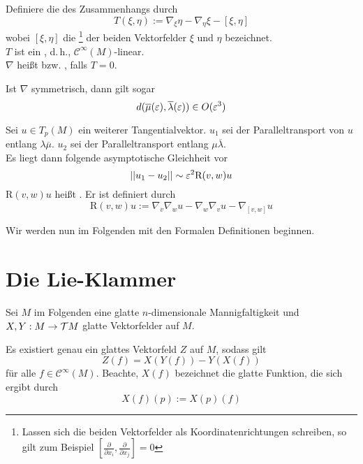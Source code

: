\Def{}
Definiere die  des Zusammenhangs durch
\[ T(\xi, \eta) := \nabla_\xi \eta - \nabla_\eta \xi - [\xi, \eta] \]
wobei $[\xi, \eta]$ die \footnote{Lassen sich die beiden Vektorfelder als Koordinatenrichtungen schreiben, so gilt zum Beispiel $[\frac{\partial}{\partial x_i}, \frac{\partial}{\partial x_j}] = 0$} der beiden Vektorfelder $\xi$ und $\eta$ bezeichnet.\\
$T$ ist ein , d.\,h., $\mathcal{C}^{\infty}(M)$-linear.\\
$\nabla$ heißt  bzw. , falls $T = 0$.

\newcommand{\crv}{\text{R}}

\Lem{}
Ist $\nabla$ symmetrisch, dann gilt sogar
\[ d(\overline{\mu}(\varepsilon), \overline{\lambda}(\varepsilon)) \in O(\varepsilon^3) \]

Sei $u \in T_p(M)$ ein weiterer Tangentialvektor. $u_1$ sei der Paralleltransport von $u$ entlang $\lambda\overline{\mu}$. $u_2$ sei der Paralleltransport entlang $\mu \overline{\lambda}$.\\
Es liegt dann folgende asymptotische Gleichheit vor
\[ \norm{u_1 - u_2} \sim \epsilon^2 \crv(v,w)u  \]
$\crv(v,w)u$ heißt . Er ist definiert durch
\[ \crv(v,w)u := \nabla_v \nabla_wu - \nabla_w \nabla_v u - \nabla_{[v,w]} u \]

Wir werden nun im Folgenden mit den Formalen Definitionen beginnen.

\newpage
\section{Die Lie-Klammer}
Sei $M$ im Folgenden eine glatte $n$-dimensionale Mannigfaltigkeit und $X,Y : M \overset{}{\rightarrow} \mathcal{T} M$ glatte Vektorfelder auf $M$.

\newcommand{\CC}[1]{\mathcal{C}^{#1}}

\Lem{}
Es existiert genau ein glattes Vektorfeld $Z$ auf $M$, sodass gilt
\[Z(f) = X(Y(f)) - Y(X(f)) \]
für alle $f \in \CC{\infty}(M)$. Beachte, $X(f)$ bezeichnet die glatte Funktion, die sich ergibt durch
\[ X(f)(p) := X(p)(f) \]

